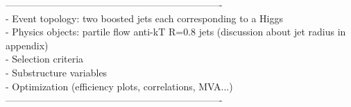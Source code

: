 -------------------------------------------------------------------\\
%

- Event topology: two boosted jets each corresponding to a Higgs \\
- Physics objects: partile flow anti-kT R=0.8 jets (discussion about jet radius in appendix) \\
- Selection criteria\\
- Substructure variables \\
- Optimization (efficiency plots, correlations, MVA...)\\
-------------------------------------------------------------------



